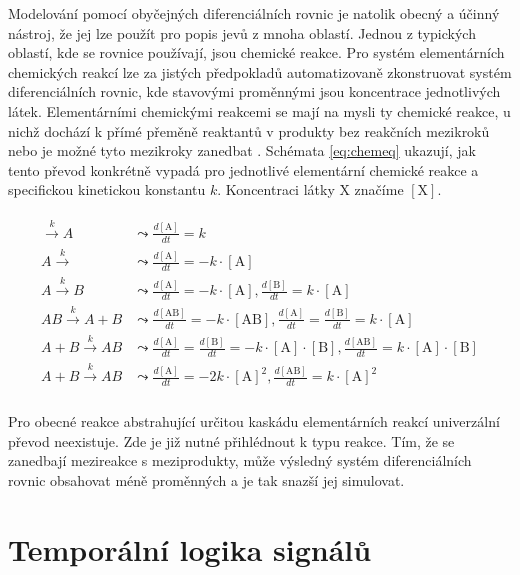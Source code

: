 Modelování pomocí obyčejných diferenciálních rovnic je natolik obecný a účinný nástroj,
že jej lze použít pro popis jevů z mnoha oblastí. Jednou z typických oblastí, kde
se rovnice používají, jsou chemické reakce. Pro systém elementárních chemických reakcí
lze za jistých předpokladů \cite{TODO} automatizovaně zkonstruovat systém diferenciálních rovnic,
kde stavovými proměnnými jsou koncentrace jednotlivých látek. Elementárními che\-mic\-ký\-mi
reakcemi se mají na mysli ty chemické reakce, u nichž dochází k přímé přeměně reaktantů
v produkty bez reakčních mezikroků nebo je možné tyto mezikroky zanedbat \cite{TODO}.
Schémata \ref{eq:chemeq} ukazují, jak tento převod konkrétně vypadá pro jednotlivé
elementární chemické reakce a specifickou kinetickou konstantu $k$. Koncentraci látky
$\textrm{X}$ značíme $[\textrm{X}]$.

\begin{align}\label{eq:chemeq}
\begin{array}{ll}
\xrightarrow{k} A			&\leadsto \frac{d[\textrm{A}]}{dt} = k						\\
A \xrightarrow{k} 			&\leadsto \frac{d[\textrm{A}]}{dt} = - k \cdot [\textrm{A}]	\\
A \xrightarrow{k} B			&\leadsto \frac{d[\textrm{A}]}{dt} = - k \cdot [\textrm{A}], \frac{d[\textrm{B}]}{dt} = k \cdot [\textrm{A}] \\
AB \xrightarrow{k} A + B	&\leadsto \frac{d[\textrm{AB}]}{dt} = - k \cdot [\textrm{AB}], \frac{d[\textrm{A}]}{dt} = \frac{d[\textrm{B}]}{dt} = k \cdot [\textrm{A}] \\
A + B \xrightarrow{k} AB	&\leadsto \frac{d[\textrm{A}]}{dt} = \frac{d[\textrm{B}]}{dt} = - k \cdot [\textrm{A}] \cdot [\textrm{B}], \frac{d[\textrm{AB}]}{dt} = k \cdot [\textrm{A}] \cdot [\textrm{B}] \\
A + B \xrightarrow{k} AB	&\leadsto \frac{d[\textrm{A}]}{dt} = - 2k \cdot [\textrm{A}]^2, \frac{d[\textrm{AB}]}{dt} = k \cdot [\textrm{A}]^2 \\
\end{array}
\end{align}

Pro obecné reakce abstrahující určitou kaskádu elementárních reakcí univerzální
převod neexistuje. Zde je již nutné přihlédnout k typu reakce. Tím, že se
zanedbají mezireakce s meziprodukty, může výsledný systém diferenciálních rovnic obsahovat
méně proměnných a je tak snazší jej simulovat.

\section{Temporální logika signálů}

